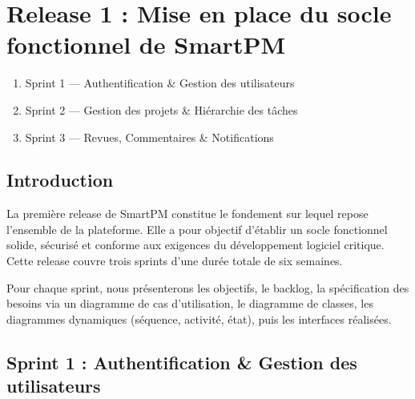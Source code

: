 \chapter{Release 1 : Mise en place du socle fonctionnel de SmartPM}

\vspace{-0.3cm}
\begin{tcolorbox}[colback=lightgray, colframe=primaryblue,
  title=\textbf{Plan}, fonttitle=\bfseries]
  \begin{enumerate}[leftmargin=*, label=\arabic*.]
    \item Sprint 1 --- Authentification \& Gestion des utilisateurs
    \item Sprint 2 --- Gestion des projets \& Hi\'erarchie des t\^aches
    \item Sprint 3 --- Revues, Commentaires \& Notifications
  \end{enumerate}
\end{tcolorbox}

\section*{Introduction}

La premi\`ere release de SmartPM constitue le fondement sur lequel repose
l'ensemble de la plateforme. Elle a pour objectif d'\'etablir un socle
fonctionnel solide, s\'ecuris\'e et conforme aux exigences du d\'eveloppement
logiciel critique. Cette release couvre trois sprints d'une dur\'ee totale de
six semaines.

\vspace{0.3cm}

Pour chaque sprint, nous pr\'esenterons les objectifs, le backlog, la
sp\'ecification des besoins via un diagramme de cas d'utilisation, le
diagramme de classes, les diagrammes dynamiques (s\'equence, activit\'e,
\'etat), puis les interfaces r\'ealis\'ees.

\newpage
\section{Sprint 1 : Authentification \& Gestion des utilisateurs}
\label{sec:s1}

